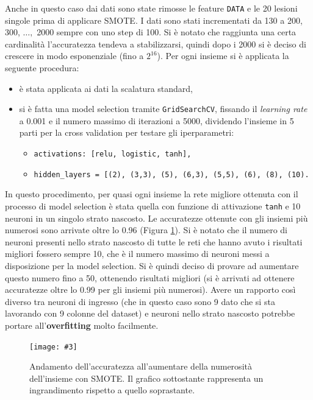 \documentclass[12pt, twoside, letterpaper]{report}
\newcommand{\imgh}[4] {
	\begin{figure}[h]
		\centering
		\texttt{[image: \#3]}\\
		\caption{#1}
		\label{fig:#4}
	\end{figure}
}
\begin{document}
			Anche in questo caso dai dati sono state rimosse le feature \texttt{DATA} e le 20 lesioni singole prima di applicare SMOTE. I dati sono stati incrementati da 130 a 200, 300, $\dots,$ 2000 sempre con uno step di 100. Si è notato che raggiunta una certa cardinalità l'accuratezza tendeva a stabilizzarsi, quindi dopo i 2000 si è deciso di crescere in modo esponenziale (fino a $2^{16}$). Per ogni insieme si è applicata la seguente procedura:
				\begin{itemize}
				 \item è stata applicata ai dati la scalatura standard,
				 \item si è fatta una model selection tramite \texttt{GridSearchCV}, fissando il \textit{learning rate} a 0.001 e il numero massimo di iterazioni a 5000, dividendo l'insieme in 5 parti per la cross validation per testare gli iperparametri:
				 	\begin{itemize}
					\item \texttt{activations: [relu, logistic, tanh],}
    				\item \texttt{hidden\_layers = [(2), (3,3), (5), (6,3), (5,5), (6), (8), (10).}
					\end{itemize}
				 \end{itemize}
			In questo procedimento, per quasi ogni insieme la rete migliore ottenuta con il processo di model selection è stata quella con funzione di attivazione \texttt{tanh} e 10 neuroni in un singolo strato nascosto. Le accuratezze ottenute con gli insiemi più numerosi sono arrivate oltre lo 0.96 (Figura \ref{fig:accuracy_smote}). Si è notato che il numero di neuroni presenti nello strato nascosto di tutte le reti che hanno avuto i risultati migliori fossero sempre 10, che è il numero massimo di neuroni messi a disposizione per la model selection. Si è quindi deciso di provare ad aumentare questo numero fino a 50, ottenendo risultati migliori (si è arrivati ad ottenere accuratezze oltre lo 0.99 per gli insiemi più numerosi). Avere un rapporto così diverso tra neuroni di ingresso (che in questo caso sono 9 dato che si sta lavorando con 9 colonne del dataset) e neuroni nello strato nascosto potrebbe portare all'\textbf{overfitting} molto facilmente.
			\imgh{Andamento dell'accuratezza all'aumentare della numerosità dell'insieme con SMOTE. Il grafico sottostante rappresenta un ingrandimento rispetto a quello soprastante.}{0.35}{accuracy_smote_1.png}{accuracy_smote}
			
\end{document}
